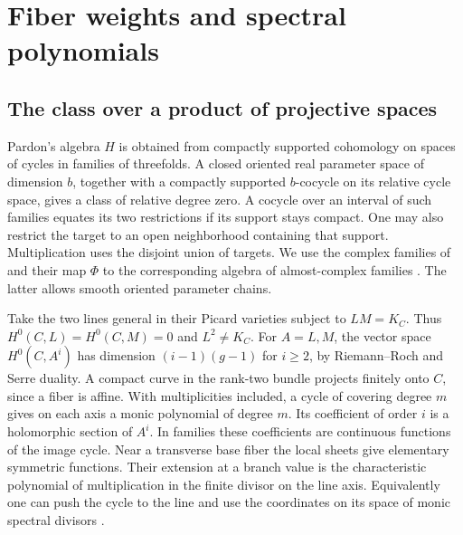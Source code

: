 \section{Fiber weights and spectral polynomials}\label{sec:weights}

\subsection{The class over a product of projective spaces}
Pardon's algebra $H$ is obtained from compactly supported cohomology on
spaces of cycles in families of threefolds. A closed oriented real
parameter space of dimension $b$, together with a compactly supported
$b$-cocycle on its relative cycle space, gives a class of relative
degree zero. A cocycle over an interval of such families equates its
two restrictions if its support stays compact. One may also restrict
the target to an open neighborhood containing that support.
Multiplication uses the disjoint union of targets. We use the complex
families of \cite[\S3]{Pardon} and their map $\Phi$ to the corresponding
algebra of almost-complex families \cite[\S2]{WueProduct}. The latter
allows smooth oriented parameter chains.

Take the two lines general in their Picard varieties subject to $LM=K_C$.
Thus $H^0(C,L)=H^0(C,M)=0$ and $L^2\ne K_C$.
For $A=L,M$, the vector space $H^0(C,A^i)$ has dimension
$(i-1)(g-1)$ for $i\ge2$, by Riemann--Roch and Serre duality.
A compact curve in the rank-two bundle projects finitely onto $C$,
since a fiber is affine. With multiplicities included, a cycle of
covering degree $m$ gives on each axis a monic polynomial of degree
$m$. Its coefficient of order $i$ is a holomorphic section of $A^i$.
In families these coefficients are continuous functions of the image
cycle. Near a transverse base fiber the local sheets give elementary
symmetric functions. Their extension at a branch value is the
characteristic polynomial of multiplication in the finite divisor on
the line axis. Equivalently one can push the cycle to the line and use
the coordinates on its space of monic spectral divisors
\cite[\S2]{WueBalanced}.

